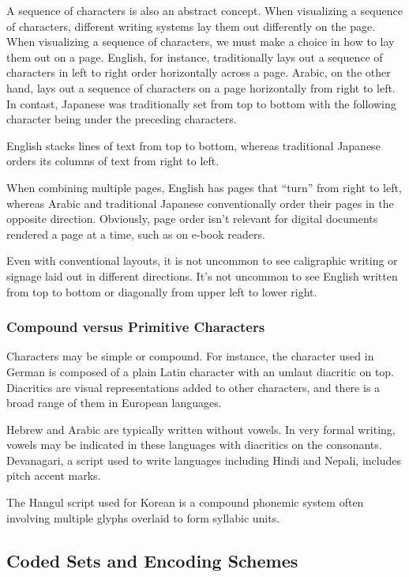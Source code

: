 A sequence of characters is also an abstract concept.  When
visualizing a sequence of characters, different writing systems lay
them out differently on the page.  When visualizing a sequence of
characters, we must make a choice in how to lay them out on a page.
English, for instance, traditionally lays out a sequence of characters
in left to right order horizontally across a page. 
Arabic, on the other hand, lays out a sequence of
characters on a page horizontally from right to left.  In contast,
Japanese was traditionally set from top to bottom with the following
character being under the preceding characters.

English stacks lines of text from top to bottom, whereas traditional
Japanese orders its columns of text from right to left.  

When combining multiple pages, English has pages that ``turn'' from
right to left, whereas Arabic and traditional Japanese conventionally
order their pages in the opposite direction.  Obviously, page order
isn't relevant for digital documents rendered a page at a time, such
as on e-book readers.

Even with conventional layouts, it is not uncommon to see caligraphic
writing or signage laid out in different directions.  It's not
uncommon to see English written from top to bottom or diagonally from
upper left to lower right.


\subsubsection{Compound versus Primitive Characters}

Characters may be simple or compound.  For instance, the character
 used in German is composed of a plain Latin 
character with an umlaut diacritic on top.  Diacritics are visual
representations added to other characters, and there is a broad range
of them in European languages.

Hebrew and Arabic are typically written without vowels.  In very
formal writing, vowels may be indicated in these languages with
diacritics on the consonants.  Devanagari, a script used to write
languages including Hindi and Nepali, includes pitch accent marks.

The Hangul script used for Korean is a compound phonemic system often
involving multiple glyphs overlaid to form syllabic units.


\subsection{Coded Sets and Encoding Schemes}


